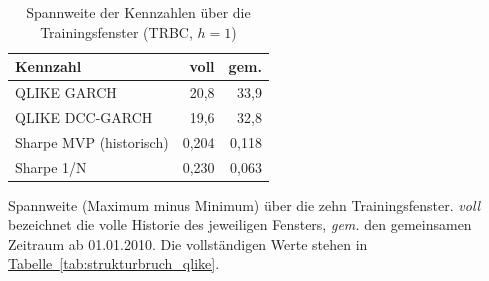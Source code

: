 \begin{table}[htbp]
  \centering
  \footnotesize
  \begin{tabular}{lrr}
    \toprule
    Kennzahl & voll & gem. \\
    \midrule
    QLIKE GARCH & 20,8 & 33,9 \\
    QLIKE DCC-GARCH & 19,6 & 32,8 \\
    Sharpe MVP (historisch) & 0,204 & 0,118 \\
    Sharpe 1/N & 0,230 & 0,063 \\
    \bottomrule
  \end{tabular}
  \caption{Spannweite der Kennzahlen über die Trainingsfenster (TRBC, $h=1$)}
  \label{tab:strukturbruch_kompakt}
  \begin{minipage}{\linewidth}\vspace{0.4em}\centering\footnotesize
  Spannweite (Maximum minus Minimum) über die zehn Trainingsfenster. \emph{voll} bezeichnet die volle Historie des jeweiligen Fensters, \emph{gem.} den gemeinsamen Zeitraum ab 01.01.2010. Die vollständigen Werte stehen in \hyperref[tab:strukturbruch_qlike]{Tabelle~\ref*{tab:strukturbruch_qlike}}.
  \end{minipage}
\end{table}
